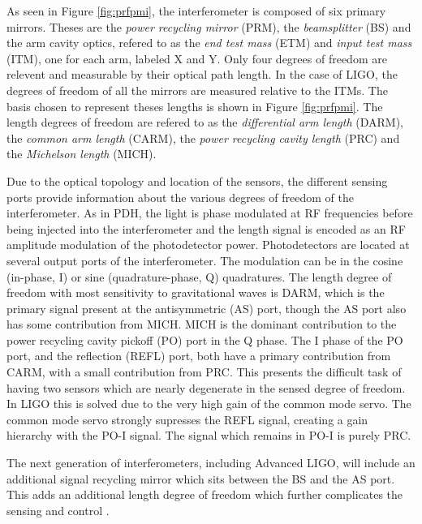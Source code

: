 As seen in Figure \ref{fig:prfpmi}, the interferometer is composed of six primary mirrors. %
Theses are the \emph{power recycling mirror} (PRM), the \emph{beamsplitter} (BS) and the arm cavity optics, refered to as the \emph{end test mass} (ETM) and \emph{input test mass} (ITM), one for each arm, labeled X and Y. %
Only four degrees of freedom are relevent and measurable by their optical path length. %
In the case of LIGO, the degrees of freedom of all the mirrors are measured relative to the ITMs. %
The basis chosen to represent theses lengths is shown in Figure \ref{fig:prfpmi}. %
The length degrees of freedom are refered to as the \emph{differential arm length} (DARM), the \emph{common arm length} (CARM), the \emph{power recycling cavity length} (PRC) and the \emph{Michelson length} (MICH).

Due to the optical topology and location of the sensors, the different sensing ports provide information about the various degrees of freedom of the interferometer. %
As in PDH, the light is phase modulated at RF frequencies before being injected into the interferometer and the length signal is encoded as an RF amplitude modulation of the photodetector power. %
Photodetectors are located at several output ports of the interferometer. %
The modulation can be in the cosine (in-phase, I) or sine (quadrature-phase, Q) quadratures. %
The length degree of freedom with most sensitivity to gravitational waves is DARM, which is the primary signal present at the antisymmetric (AS) port, though the AS port also has some contribution from MICH. %
MICH is the dominant contribution to the power recycling cavity pickoff (PO) port in the Q phase. %
The I phase of the PO port, and the reflection (REFL) port, both have a primary contribution from CARM, with a small contribution from PRC. %
This presents the difficult task of having two sensors which are nearly degenerate in the sensed degree of freedom. %
In LIGO this is solved due to the very high gain of the common mode servo. %
The common mode servo strongly supresses the REFL signal, creating a gain hierarchy with the PO-I signal. %
The signal which remains in PO-I is purely PRC.

The next generation of interferometers, including Advanced LIGO, will include an additional signal recycling mirror which sits between the BS and the AS port. %
This adds an additional length degree of freedom which further complicates the sensing and control \cite{T1000298}.

